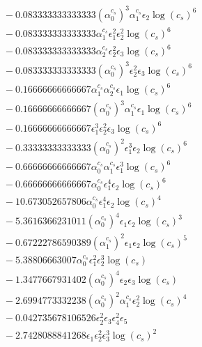 \documentclass[10pt]{article}
\begin{document}
\begin{align*}
&{}  - 0.083333333333333 \left(\alpha_{0}^{c_s}\right)^{3} \alpha_{1}^{c_s} \epsilon_{2} \log{\left(c_{s} \right)}^{6} \\
&{}  - 0.083333333333333 \alpha_{1}^{c_s} \epsilon_{1}^{2} \epsilon_{2}^{2} \log{\left(c_{s} \right)}^{6} \\
&{}  - 0.083333333333333 \alpha_{2}^{c_s} \epsilon_{2}^{2} \epsilon_{3} \log{\left(c_{s} \right)}^{6} \\
&{}  - 0.083333333333333 \left(\alpha_{0}^{c_s}\right)^{3} \epsilon_{2}^{2} \epsilon_{3} \log{\left(c_{s} \right)}^{6} \\
&{}  - 0.16666666666667 \alpha_{1}^{c_s} \alpha_{2}^{c_s} \epsilon_{1} \log{\left(c_{s} \right)}^{6} \\
&{}  - 0.16666666666667 \left(\alpha_{0}^{c_s}\right)^{3} \alpha_{1}^{c_s} \epsilon_{1} \log{\left(c_{s} \right)}^{6} \\
&{}  - 0.16666666666667 \epsilon_{1}^{3} \epsilon_{2}^{2} \epsilon_{3} \log{\left(c_{s} \right)}^{6} \\
&{}  - 0.33333333333333 \left(\alpha_{0}^{c_s}\right)^{2} \epsilon_{1}^{3} \epsilon_{2} \log{\left(c_{s} \right)}^{6} \\
&{}  - 0.66666666666667 \alpha_{0}^{c_s} \alpha_{1}^{c_s} \epsilon_{1}^{3} \log{\left(c_{s} \right)}^{6} \\
&{}  - 0.66666666666667 \alpha_{0}^{c_s} \epsilon_{1}^{4} \epsilon_{2} \log{\left(c_{s} \right)}^{6} \\
&{}  - 10.673052657806 \alpha_{0}^{c_s} \epsilon_{1}^{4} \epsilon_{2} \log{\left(c_{s} \right)}^{4} \\
&{}  - 5.3616366231011 \left(\alpha_{0}^{c_s}\right)^{4} \epsilon_{1} \epsilon_{2} \log{\left(c_{s} \right)}^{3} \\
&{}  - 0.67222786590389 \left(\alpha_{1}^{c_s}\right)^{2} \epsilon_{1} \epsilon_{2} \log{\left(c_{s} \right)}^{5} \\
&{}  - 5.38806663007 \alpha_{0}^{c_s} \epsilon_{1}^{2} \epsilon_{2}^{3} \log{\left(c_{s} \right)} \\
&{}  - 1.3477667931402 \left(\alpha_{0}^{c_s}\right)^{4} \epsilon_{2} \epsilon_{3} \log{\left(c_{s} \right)} \\
&{}  - 2.6994773332238 \left(\alpha_{0}^{c_s}\right)^{2} \alpha_{1}^{c_s} \epsilon_{2}^{2} \log{\left(c_{s} \right)}^{4} \\
&{}  - 0.042735678106526 \epsilon_{2}^{2} \epsilon_{3} \epsilon_{4}^{2} \epsilon_{5} \\
&{}  - 2.7428088841268 \epsilon_{1} \epsilon_{2}^{2} \epsilon_{3}^{3} \log{\left(c_{s} \right)}^{2} \\

\end{align*}
\end{document}
